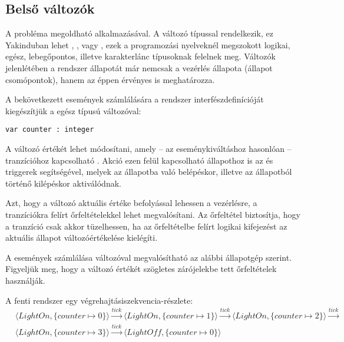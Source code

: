 \subsection{Belső változók}

A probléma megoldható  alkalmazásával. A változó típussal rendelkezik, ez Yakinduban lehet , ,  vagy , ezek a programozási nyelveknél megszokott logikai, egész, lebegőpontos, illetve karakterlánc típusoknak felelnek meg. Változók jelenlétében a rendszer állapotát már nemcsak a vezérlés állapota (állapot csomópontok), hanem az éppen érvényes  is meghatározza.

\begin{megjegyzes}
A bekövetkezett  események számlálására a rendszer interfészdefinícióját kiegészítjük a  egész típusú változóval:

\begin{lstlisting}
var counter : integer
\end{lstlisting}
\end{megjegyzes}

A változó értékét  lehet módosítani, amely -- az eseménykiváltáshoz hasonlóan -- tranzícióhoz kapcsolható . Akció ezen felül kapcsolható állapothoz is az  és  triggerek segítségével, melyek az állapotba való belépéskor, illetve az állapotból történő kilépéskor aktiválódnak.

Azt, hogy a változó aktuális értéke befolyással lehessen a vezérlésre, a tranzíciókra felírt őrfeltételekkel lehet megvalósítani. Az őrfeltétel biztosítja, hogy a tranzíció csak akkor tüzelhessen, ha az őrfeltételbe felírt logikai kifejezést az aktuális állapot változóértékelése kielégíti.

\begin{megjegyzes}
A  események számlálása változóval megvalósítható az alábbi állapotgép szerint. Figyeljük meg, hogy a változó értékét szögletes zárójelekbe tett őrfeltételek használják.
\end{megjegyzes}


\begin{megjegyzes}
A fenti rendszer egy végrehajtásiszekvencia-részlete:
\begin{align*}
& \langle \mathit{LightOn}, \{ \mathit{counter} \mapsto 0 \} \rangle \xrightarrow{\mathit{tick}} 
  \langle \mathit{LightOn}, \{ \mathit{counter} \mapsto 1 \} \rangle \xrightarrow{\mathit{tick}}
  \langle \mathit{LightOn}, \{ \mathit{counter} \mapsto 2 \} \rangle \xrightarrow{\mathit{tick}} \\
& \langle \mathit{LightOn}, \{ \mathit{counter} \mapsto 3 \} \rangle \xrightarrow{\mathit{tick}} 
  \langle \mathit{LightOff}, \{ \mathit{counter} \mapsto 0 \} \rangle
\end{align*}

\end{megjegyzes}

